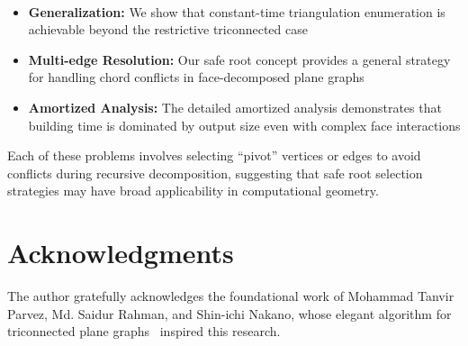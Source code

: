 ﻿﻿\documentclass[12pt,a4paper]{article}
\theoremstyle{definition}
\theoremstyle{remark}
\begin{document}
\begin{itemize}
	\item \textbf{Generalization:} We show that constant-time triangulation enumeration is achievable beyond the restrictive triconnected case
	\item \textbf{Multi-edge Resolution:} Our safe root concept provides a general strategy for handling chord conflicts in face-decomposed plane graphs
	\item \textbf{Amortized Analysis:} The detailed amortized analysis demonstrates that building time is dominated by output size even with complex face interactions
\end{itemize}



Each of these problems involves selecting ``pivot'' vertices or edges to avoid conflicts during recursive decomposition, suggesting that safe root selection strategies may have broad applicability in computational geometry.

\section*{Acknowledgments}

The author gratefully acknowledges the foundational work of Mohammad Tanvir Parvez, Md. Saidur Rahman, and Shin-ichi Nakano, whose elegant algorithm for triconnected plane graphs~\cite{parvez2011} inspired this research.



\end{document}
